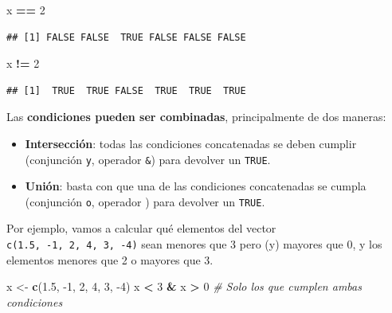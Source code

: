 \documentclass[11pt,]{book}
\newenvironment{Shaded}{\begin{snugshade}}{\end{snugshade}}
\newcommand{\CommentTok}[1]{\textcolor[rgb]{0.37,0.37,0.37}{\textit{#1}}}
\newcommand{\DecValTok}[1]{\textcolor[rgb]{0.06,0.06,0.06}{#1}}
\newcommand{\FloatTok}[1]{\textcolor[rgb]{0.06,0.06,0.06}{#1}}
\newcommand{\KeywordTok}[1]{\textcolor[rgb]{0.27,0.27,0.27}{\textbf{#1}}}
\newcommand{\NormalTok}[1]{#1}
\newcommand{\OperatorTok}[1]{\textcolor[rgb]{0.43,0.43,0.43}{\textbf{#1}}}
\newcommand{\StringTok}[1]{\textcolor[rgb]{0.5,0.5,0.5}{#1}}
\begin{document}
\begin{Shaded}
\begin{Highlighting}[]
\NormalTok{x }\OperatorTok{==}\StringTok{ }\DecValTok{2}
\end{Highlighting}
\end{Shaded}

\begin{verbatim}
## [1] FALSE FALSE  TRUE FALSE FALSE FALSE
\end{verbatim}

\begin{Shaded}
\begin{Highlighting}[]
\NormalTok{x }\OperatorTok{!=}\StringTok{ }\DecValTok{2}
\end{Highlighting}
\end{Shaded}

\begin{verbatim}
## [1]  TRUE  TRUE FALSE  TRUE  TRUE  TRUE
\end{verbatim}

Las \textbf{condiciones pueden ser combinadas}, principalmente de dos maneras:

\begin{itemize}
\item
  \textbf{Intersección}: todas las condiciones concatenadas se deben cumplir (conjunción \texttt{y}, operador \texttt{\&}) para devolver un \texttt{TRUE}.
\item
  \textbf{Unión}: basta con que una de las condiciones concatenadas se cumpla (conjunción \texttt{o}, operador \texttt{\textbar{}}) para devolver un \texttt{TRUE}.
\end{itemize}

Por ejemplo, vamos a calcular qué elementos del vector \texttt{c(1.5,\ -1,\ 2,\ 4,\ 3,\ -4)} sean menores que 3 pero (y) mayores que 0, y los elementos menores que 2 o mayores que 3.

\begin{Shaded}
\begin{Highlighting}[]
\NormalTok{x <-}\StringTok{ }\KeywordTok{c}\NormalTok{(}\FloatTok{1.5}\NormalTok{, }\DecValTok{-1}\NormalTok{, }\DecValTok{2}\NormalTok{, }\DecValTok{4}\NormalTok{, }\DecValTok{3}\NormalTok{, }\DecValTok{-4}\NormalTok{)}
\NormalTok{x }\OperatorTok{<}\StringTok{ }\DecValTok{3} \OperatorTok{&}\StringTok{ }\NormalTok{x }\OperatorTok{>}\StringTok{ }\DecValTok{0} \CommentTok{# Solo los que cumplen ambas condiciones}
\end{Highlighting}
\end{Shaded}
\end{document}
